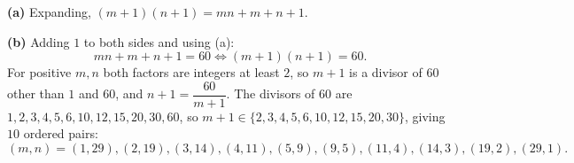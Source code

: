 \textbf{(a)} Expanding, $(m+1)(n+1)=mn+m+n+1$.

\textbf{(b)} Adding $1$ to both sides and using (a):
\[mn+m+n+1=60\iff(m+1)(n+1)=60.\]
For positive $m,n$ both factors are integers at least $2$, so $m+1$ is a divisor of $60$ other than $1$ and $60$, and $n+1=\dfrac{60}{m+1}$. The divisors of $60$ are $1,2,3,4,5,6,10,12,15,20,30,60$, so $m+1\in\{2,3,4,5,6,10,12,15,20,30\}$, giving $10$ ordered pairs:
\[\boxed{(m,n)=(1,29),(2,19),(3,14),(4,11),(5,9),(9,5),(11,4),(14,3),(19,2),(29,1)}.\]
